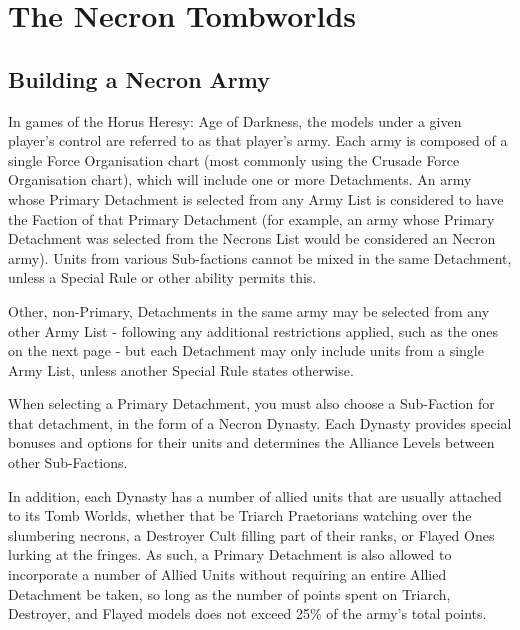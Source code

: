 \section{The Necron Tombworlds}


\subsection{Building a Necron Army}

In games of the Horus Heresy: Age of Darkness, the models under a given player’s control are referred to as that player’s army. Each army is composed of a single Force Organisation chart (most commonly using the Crusade Force Organisation chart), which will include one or more Detachments. An army whose Primary Detachment is selected from any Army List is considered to have the Faction of that Primary Detachment (for example, an army whose Primary Detachment was selected from the Necrons List would be considered an Necron army). Units from various Sub-factions cannot be mixed in the same Detachment, unless a Special Rule or other ability permits this.

Other, non-Primary, Detachments in the same army may be selected from any other Army List - following any additional restrictions applied, such as the ones on the next page - but each Detachment may only include units from a single Army List, unless another Special Rule states otherwise.

When selecting a Primary Detachment, you must also choose a Sub-Faction for that detachment, in the form of a Necron Dynasty. Each Dynasty provides special bonuses and options for their units and determines the Alliance Levels between other Sub-Factions.

In addition, each Dynasty has a number of allied units that are usually attached to its Tomb Worlds, whether that be Triarch Praetorians watching over the slumbering necrons, a Destroyer Cult filling part of their ranks, or Flayed Ones lurking at the fringes. As such, a Primary Detachment is also allowed to incorporate a number of Allied Units without requiring an entire Allied Detachment be taken, so long as the number of points spent on Triarch, Destroyer, and Flayed models does not exceed 25\% of the army's total points.

